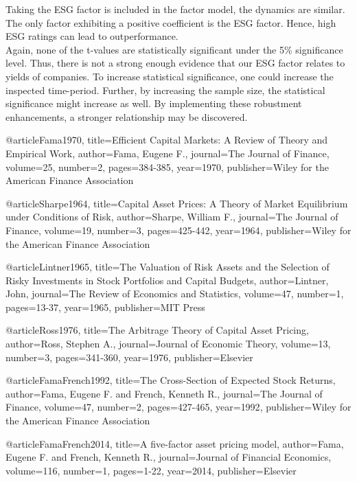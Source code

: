 \documentclass[12pt, a4paper]{article}%
\begin{document}
Taking the ESG factor is included in the factor model, the dynamics are similar. The only factor exhibiting a positive coefficient is the ESG factor. Hence, high ESG ratings can lead to outperformance.\\
Again, none of the t-values are statistically significant under the 5\% significance level. Thus, there is not a strong enough evidence that our ESG factor relates to yields of companies.
To increase statistical significance, one could increase the inspected time-period. Further, by increasing the sample size, the statistical significance might increase as well. By implementing these robustment enhancements, a stronger relationship may be discovered.


\begin{thebibliography}{1} %

@article{Fama1970,
    title={Efficient Capital Markets: A Review of Theory and Empirical Work},
    author={Fama, Eugene F.},
    journal={The Journal of Finance},
    volume={25},
    number={2},
    pages={384-385},
    year={1970},
    publisher={Wiley for the American Finance Association}
}

@article{Sharpe1964,
    title={Capital Asset Prices: A Theory of Market Equilibrium under Conditions of Risk},
    author={Sharpe, William F.},
    journal={The Journal of Finance},
    volume={19},
    number={3},
    pages={425-442},
    year={1964},
    publisher={Wiley for the American Finance Association}
}

@article{Lintner1965,
    title={The Valuation of Risk Assets and the Selection of Risky Investments in Stock Portfolios and Capital Budgets},
    author={Lintner, John},
    journal={The Review of Economics and Statistics},
    volume={47},
    number={1},
    pages={13-37},
    year={1965},
    publisher={MIT Press}
}

@article{Ross1976,
    title={The Arbitrage Theory of Capital Asset Pricing},
    author={Ross, Stephen A.},
    journal={Journal of Economic Theory},
    volume={13},
    number={3},
    pages={341-360},
    year={1976},
    publisher={Elsevier}
}

@article{FamaFrench1992,
    title={The Cross-Section of Expected Stock Returns},
    author={Fama, Eugene F. and French, Kenneth R.},
    journal={The Journal of Finance},
    volume={47},
    number={2},
    pages={427-465},
    year={1992},
    publisher={Wiley for the American Finance Association}
}


@article{FamaFrench2014,
    title={A five-factor asset pricing model},
    author={Fama, Eugene F. and French, Kenneth R.},
    journal={Journal of Financial Economics},
    volume={116},
    number={1},
    pages={1-22},
    year={2014},
    publisher={Elsevier}
}



\end{thebibliography}
\end{document}
